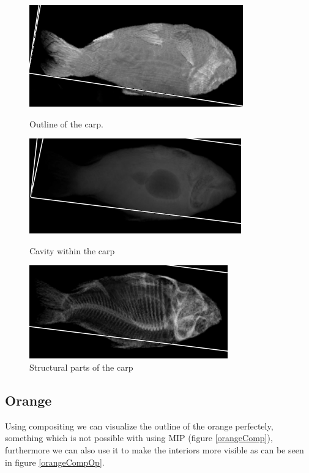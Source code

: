 \documentclass[a4paper,twoside,11pt]{article}
\begin{document}
 \begin{figure}[h]
 \includegraphics[width=\linewidth]{images/carpComp}
 \caption{Outline of the carp.}
 \label{carpComp}
\endminipage\hfill
{}
 \includegraphics[width=\linewidth]{images/carpComp2}
 \caption{Cavity within the carp}
 \label{carpComp2}
\endminipage\hfill
{}
 \includegraphics[width=\linewidth]{images/carpComp4}
 \caption{Structural parts of the carp}
 \label{carpComp3}
\endminipage\hfill
 \centering
 \end{figure}
 
 \subsection{Orange}
 Using compositing we can visualize the outline of the orange perfectely, something which is not possible with using MIP (figure \ref{orangeComp}), furthermore we can also use it to make the interiors more visible as can be seen in figure \ref{orangeCompOp}.
\end{document}
